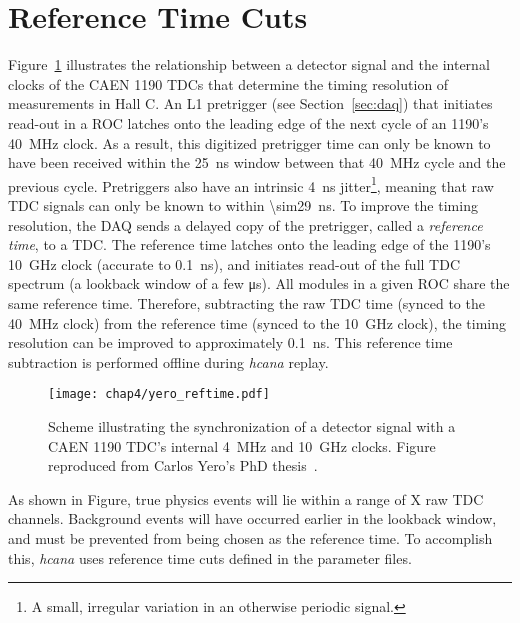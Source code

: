 \section{Reference Time Cuts} \label{sec:reftime}

Figure~\ref{fig:reference_time_cartoon} illustrates the relationship
between a detector signal and the internal clocks of the CAEN 1190 TDCs that
determine the timing resolution of measurements in Hall C.
An L1 pretrigger (see Section~\ref{sec:daq}) that initiates read-out
in a ROC latches onto the leading edge of the next cycle of an 1190's
\SI{40}{\mega\hertz} clock.
As a result, this digitized pretrigger time can only be known to have been
received within the \SI{25}{\nano\second} window between that
\SI{40}{\mega\hertz} cycle and the previous cycle.
Pretriggers also have an intrinsic \SI{4}{\nano\second}
jitter\footnote{A small, irregular variation in an otherwise periodic signal.},
meaning that raw TDC signals can only be known to within
\SI{\sim29}{\nano\second}.
To improve the timing resolution, the DAQ sends a delayed copy of the
pretrigger, called a \textit{reference time}, to a TDC.
The reference time latches onto the leading edge of the 1190's
\SI{10}{\giga\hertz} clock (accurate to \SI{0.1}{\nano\second}), and initiates
read-out of the full TDC spectrum (a lookback window of a few
\si{\micro\second}).
All modules in a given ROC share the same reference time.
Therefore, subtracting the raw TDC time (synced to the \SI{40}{\mega\hertz}
clock) from the reference time (synced to the \SI{10}{\giga\hertz} clock),
the timing resolution can be improved to approximately \SI{0.1}{\nano\second}.
This reference time subtraction is performed offline during \textit{hcana}
replay.


\begin{figure}[!h]
    \centering
    \texttt{[image: chap4/yero\_reftime.pdf]}
    \caption[Scheme illustrating the synchronization of a detector signal
            with a CAEN 1190 TDC's internal \SI{4}{\mega\hertz} and
            \SI{10}{\giga\hertz} clocks.]{
            Scheme illustrating the synchronization of a detector signal
            with a CAEN 1190 TDC's internal \SI{4}{\mega\hertz} and
            \SI{10}{\giga\hertz} clocks. Figure reproduced from Carlos Yero's
            PhD thesis~\cite{Yero_2020}.
            }
    \label{fig:reference_time_cartoon}
\end{figure}


As shown in Figure,
true physics events will lie within a range of X raw TDC channels.
Background events will have occurred earlier in the lookback window, and must
be prevented from being chosen as the reference time.
To accomplish this, \textit{hcana} uses reference time cuts defined in
the parameter files.


